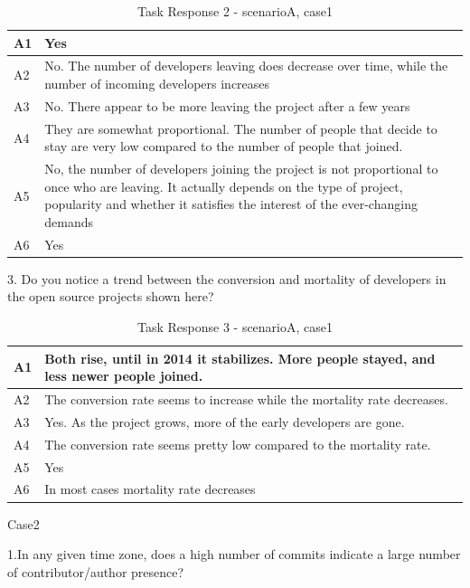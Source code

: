 \documentclass[seploa]{beavtex}
\begin{document}
\begin{appendices}
\begin{table}[H]
\begin{tabular}{ |p{2cm}|p{12cm}| }
 \hline
 A1 & Yes\\
 \hline
 A2 & No. The number of developers leaving does decrease over time, while the number of incoming developers increases\\ \hline
 A3 & No. There appear to be more leaving the project after a few years\\ \hline
 A4 & They are somewhat proportional. The number of people that decide to stay are very low compared to the number of people that joined.\\ \hline
 A5 & No, the number of developers joining the project is not proportional to once who are leaving. It actually depends on the type of project, popularity and whether it satisfies the interest of the ever-changing demands\\ \hline
 A6 & Yes\\
 \hline
\end{tabular}
\caption{Task Response 2 - scenarioA, case1}
\label{tab:table2}
\end{table}


3. Do you notice a trend between the conversion and mortality of developers in the open source projects shown here?

\begin{table}[H]
\begin{tabular}{ |p{2cm}|p{12cm}| }
 \hline
 A1 & Both rise, until in 2014 it stabilizes. More people stayed, and less newer people joined.\\
 \hline
 A2 & The conversion rate seems to increase while the mortality rate decreases.\\ \hline
 A3 & Yes. As the project grows, more of the early developers are gone.\\ \hline
 A4 & The conversion rate seems pretty low compared to the mortality rate.\\ \hline
 A5 & Yes\\ \hline
 A6 & In most cases mortality rate decreases\\
 \hline
\end{tabular}
\caption{Task Response 3 - scenarioA, case1}
\label{tab:table3}
\end{table}

Case2

1.In any given time zone, does a high number of commits indicate a large number of contributor/author presence?


\end{appendices}
\end{document}
